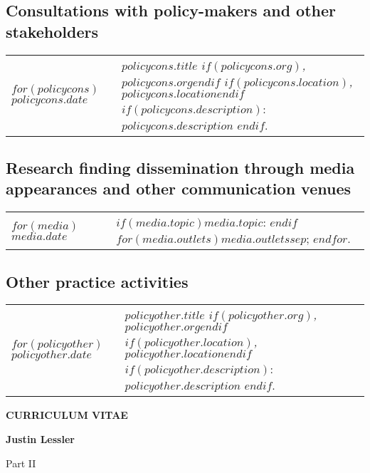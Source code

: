 \documentclass[martgin, line]{article}
\begin{document}
\subsection*{Consultations with policy-makers and other
  stakeholders}

\setlength{\extrarowheight}{.75em}
\begin{longtable}[l]{lp{5in}}   
$for(policycons)$
$policycons.date$&
\parbox[t]{5in}{
    \textit{$policycons.title$%
    $if(policycons.org)$, $policycons.org$$endif$%
    $if(policycons.location)$, $policycons.location$$endif$}%
    $if(policycons.description)$: %
    $policycons.description$%
    $endif$.%
  }\\
$endfor$
\end{longtable}
\setlength{\extrarowheight}{0em}

\subsection*{Research finding dissemination through media appearances
  and other communication venues}


\setlength{\extrarowheight}{.75em}
\begin{longtable}[l]{lp{5in}}   
$for(media)$
$media.date$&
\parbox[t]{5in}{
    $if(media.topic)$$media.topic$: $endif$%
    $for(media.outlets)$$media.outlets$$sep$; $endfor$.%
  }\\
$endfor$
\end{longtable}
\setlength{\extrarowheight}{0em}




\subsection*{Other practice activities}

\setlength{\extrarowheight}{.75em}
\begin{longtable}[l]{lp{5in}}   
$for(policyother)$
$policyother.date$&
\parbox[t]{5in}{
    \textit{$policyother.title$%
    $if(policyother.org)$, $policyother.org$$endif$%
    $if(policyother.location)$, $policyother.location$$endif$}%
    $if(policyother.description)$: %
    $policyother.description$%
    $endif$.%
  }\\
$endfor$
\end{longtable}
\setlength{\extrarowheight}{0em}


  

\clearpage
  \begin{center}
    \textbf{CURRICULUM VITAE}

    \textbf{Justin Lessler}

    Part II
  \end{center}
\end{document}
